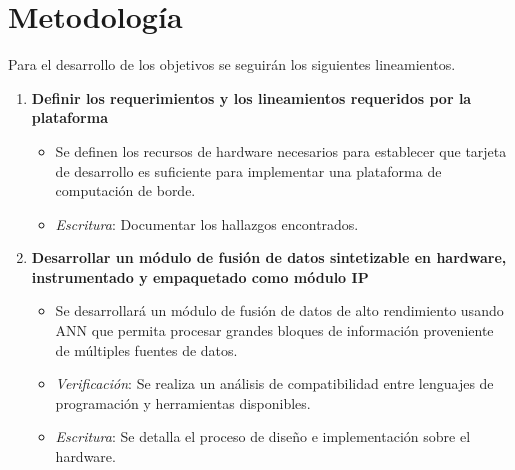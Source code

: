 
\chapter{Metodología} %
\label{Chapter8}

Para el desarrollo de  los objetivos se seguirán los siguientes lineamientos.
\begin{enumerate}
\item \textbf{Definir los requerimientos y los lineamientos requeridos por la plataforma}
\begin{itemize}
\item Se definen los recursos de hardware necesarios para establecer que tarjeta de desarrollo es suficiente para implementar una plataforma de computación de borde.
\item \textit{Escritura}: Documentar los hallazgos encontrados.
\end{itemize}

\item \textbf{Desarrollar un módulo de fusión de datos sintetizable en hardware, instrumentado y empaquetado como módulo IP}

\begin{itemize}
\item Se desarrollará un módulo de fusión de datos de alto rendimiento usando ANN que permita procesar grandes bloques de información proveniente de múltiples fuentes de datos.
\item \textit{Verificación}: Se realiza un análisis de compatibilidad entre lenguajes de programación y herramientas disponibles.
\item \textit{Escritura}: Se detalla el proceso de diseño e implementación sobre el hardware.
\end{itemize}


\end{enumerate}

